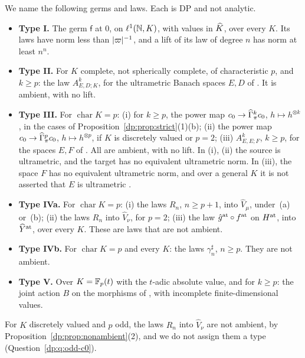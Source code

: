 \begin{definition}[types]\label{dp:def:types}
We name the following germs and laws. Each is DP and not analytic.
\begin{itemize}
\item[] \textbf{Type I.} The germ $\mathsf f$ at $0$, on $\ell^1(\mathbb N,K)$, with values in $\widehat K$, over every $K$. Its laws have norm less than $\lvert \varpi\rvert^{-1}$, and a lift of its law of degree $n$ has norm at least $n^n$.
\item[] \textbf{Type II.} For $K$ complete, not spherically complete, of characteristic $p$, and $k\ge p$: the law $A^k_{E,D;K}$, for the ultrametric Banach spaces $E,D$ of \cite[Theorem~7.2(2)]{I}. It is ambient, with no lift.
\item[] \textbf{Type III.} For $\operatorname{char}K=p$: \textup{(i)} for $k\ge p$, the power map $c_0\to\widehat\Gamma^k_\pi c_0$, $h\mapsto h^{\otimes k}$, in the cases of Proposition~\ref{dp:prop:strict}(1)(b); \textup{(ii)} the power map $c_0\to\widehat\Gamma^p_\pi c_0$, $h\mapsto h^{\otimes p}$, if $K$ is discretely valued or $p=2$; \textup{(iii)} $A^k_{E,E;F}$, $k\ge p$, for the spaces $E,F$ of \cite[Theorem~7.2(1)]{I}. All are ambient, with no lift. In (i), (ii) the source is ultrametric, and the target has no equivalent ultrametric norm. In (iii), the space $F$ has no equivalent ultrametric norm, and over a general $K$ it is not asserted that $E$ is ultrametric \cite[Remark~E.2]{I}.
\item[] \textbf{Type IVa.} For $\operatorname{char}K=p$: \textup{(i)} the laws $R_n$, $n\ge p+1$, into $\widehat V_\mu$, under~(a) or~(b); \textup{(ii)} the laws $R_n$ into $\widehat V_\nu$, for $p=2$; \textup{(iii)} the law $\hat g^{\rm at}\circ f^{\rm at}$ on $H^{\rm at}$, into $\widehat Y^{\rm at}$, over every $K$. These are laws that are not ambient.
\item[] \textbf{Type IVb.} For $\operatorname{char}K=p$ and every $K$: the laws $\gamma^\sharp_n$, $n\ge p$. They are not ambient.
\item[] \textbf{Type V.} Over $K=\mathbb F_p(t)$ with the $t$-adic absolute value, and for $k\ge p$: the joint action $B$ on the morphisms of \cite[Theorem~H.4]{I}, with incomplete finite-dimensional values.
\end{itemize}
For $K$ discretely valued and $p$ odd, the laws $R_n$ into $\widehat V_\nu$ are not ambient, by Proposition~\ref{dp:prop:nonambient}(2), and we do not assign them a type (Question~\ref{dp:q:odd-c0}).
\end{definition}


